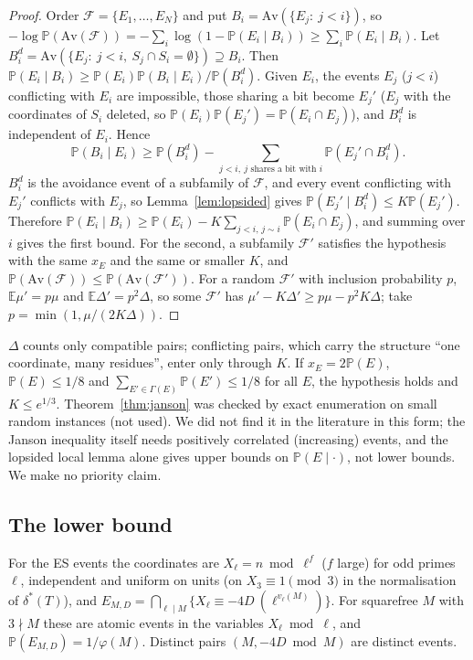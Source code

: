 \documentclass[11pt,reqno]{amsart}
\theoremstyle{definition}
\newcommand{\E}{\mathbb E}
\newcommand{\PP}{\mathbb P}
\begin{document}
\begin{proof}
Order $\mathcal F=\{E_1,\dots,E_N\}$ and put $B_i=\mathrm{Av}(\{E_j:\ j<i\})$, so
$-\log\PP(\mathrm{Av}(\mathcal F))=-\sum_i\log(1-\PP(E_i\mid B_i))\ge\sum_i\PP(E_i\mid B_i)$.
Let $B_i^d=\mathrm{Av}(\{E_j:\ j<i,\ S_j\cap S_i=\emptyset\})\supseteq B_i$.  Then
$\PP(E_i\mid B_i)\ge\PP(E_i)\PP(B_i\mid E_i)/\PP(B_i^d)$.  Given $E_i$, the
events $E_j$ ($j<i$) conflicting with $E_i$ are impossible, those sharing a bit
become $E_j'$ ($E_j$ with the coordinates of $S_i$ deleted, so
$\PP(E_i)\PP(E_j')=\PP(E_i\cap E_j)$), and $B_i^d$ is independent of $E_i$.  Hence
\[
 \PP(B_i\mid E_i)\ge\PP(B_i^d)-\sum_{j<i,\ j\text{ shares a bit with }i}\PP(E_j'\cap B_i^d).
\]
$B_i^d$ is the avoidance event of a subfamily of $\mathcal F$, and every event
conflicting with $E_j'$ conflicts with $E_j$, so Lemma~\ref{lem:lopsided}
gives $\PP(E_j'\mid B_i^d)\le K\PP(E_j')$.  Therefore
$\PP(E_i\mid B_i)\ge\PP(E_i)-K\sum_{j<i,\,j\sim i}\PP(E_i\cap E_j)$, and summing over
$i$ gives the first bound.  For the second, a subfamily $\mathcal F'$
satisfies the hypothesis with the same $x_E$ and the same or smaller $K$,
and $\PP(\mathrm{Av}(\mathcal F))\le\PP(\mathrm{Av}(\mathcal F'))$.  For a random
$\mathcal F'$ with inclusion probability $p$, $\E\mu'=p\mu$ and
$\E\Delta'=p^2\Delta$, so some $\mathcal F'$ has $\mu'-K\Delta'\ge p\mu-p^2K\Delta$; take
$p=\min(1,\mu/(2K\Delta))$.
\end{proof}

$\Delta$ counts only compatible pairs; conflicting pairs, which carry the
structure ``one coordinate, many residues'', enter only through $K$.  If
$x_E=2\PP(E)$, $\PP(E)\le1/8$ and $\sum_{E'\in\Gamma(E)}\PP(E')\le1/8$ for all $E$,
the hypothesis holds and $K\le e^{1/3}$.  Theorem~\ref{thm:janson} was
checked by exact enumeration on small random instances (not used).  We did
not find it in the literature in this form; the Janson inequality itself
\cite{Janson} needs positively correlated (increasing) events, and the
lopsided local lemma alone gives upper bounds on $\PP(E\mid\cdot)$, not lower
bounds.  We make no priority claim.

\subsection*{The lower bound}
For the ES events the coordinates are $X_\ell=n\bmod\ell^{f}$ ($f$ large) for
odd primes $\ell$, independent and uniform on units (on $X_3\equiv1\pmod3$ in
the normalisation of $\delta^*(T)$), and
$E_{M,D}=\bigcap_{\ell\mid M}\{X_\ell\equiv-4D\ (\ell^{v_\ell(M)})\}$.  For squarefree $M$
with $3\nmid M$ these are atomic events in the variables $X_\ell\bmod\ell$, and
$\PP(E_{M,D})=1/\varphi(M)$.  Distinct pairs $(M,-4D\bmod M)$ are distinct
events.
\end{document}
